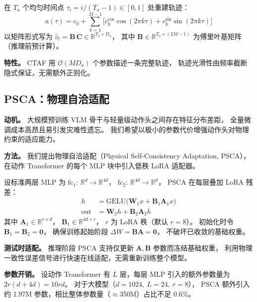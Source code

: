 \documentclass[10pt,twocolumn]{article}
\begin{document}
在 $T_a$ 个均匀时间点 $\tau_i = i/(T_a{-}1) \in [0,1]$ 处重建轨迹：
\begin{equation}
  a(\tau) = c_0 + \sum_{k=1}^{M-1}
    \bigl[c_k^{\cos}\cos(2\pi k\tau)
        + c_k^{\sin}\sin(2\pi k\tau)\bigr]
\end{equation}
以矩阵形式写为
$\hat{v}_t = \mathbf{B}\,\mathbf{C} \in \mathbb{R}^{T_a \times D_a}$，
其中 $\mathbf{B} \in \mathbb{R}^{T_a \times (2M-1)}$ 为傅里叶基矩阵（推理前预计算）。

\noindent\textbf{特性。}
CTAF 用 $\mathcal{O}(MD_a)$ 个参数描述一条完整轨迹，
轨迹光滑性由频率截断隐式保证，无需额外正则化。

\subsection{PSCA：物理自洽适配}
\label{sec:psca}

\noindent\textbf{动机。}
大规模预训练 VLM 骨干与轻量级动作头之间存在特征分布差距，
全量微调成本高昂且易引发灾难性遗忘。
我们希望以极小的参数代价增强动作头对物理约束的适应能力。

\noindent\textbf{方法。}
我们提出物理自洽适配（Physical Self-Consistency Adaptation, PSCA），
在动作 Transformer 的每个 MLP 块中引入低秩 LoRA 适配器。

设标准两层 MLP 为
$\mathrm{fc}_1{:}\ \mathbb{R}^{d} \to \mathbb{R}^{4d}$，
$\mathrm{fc}_2{:}\ \mathbb{R}^{4d} \to \mathbb{R}^{d}$，
PSCA 在每层叠加 LoRA 残差：
\begin{align}
  h   &= \mathrm{GELU}\!\bigl(\mathbf{W}_1 x + \mathbf{B}_1\mathbf{A}_1 x\bigr) \\
  \mathrm{out} &= \mathbf{W}_2 h + \mathbf{B}_2\mathbf{A}_2 h
\end{align}
其中 $\mathbf{A}_1 \in \mathbb{R}^{r \times d}$，
$\mathbf{B}_1 \in \mathbb{R}^{4d \times r}$，
$r$ 为 LoRA 秩（默认 $r{=}8$）。
初始化时令 $\mathbf{B}_1 = \mathbf{B}_2 = \mathbf{0}$，
确保训练起始阶段 $\Delta W = \mathbf{B}\mathbf{A} = \mathbf{0}$，
不破坏已收敛的基础权重。

\noindent\textbf{测试时适配。}
推理阶段 PSCA 支持仅更新 $\mathbf{A},\mathbf{B}$ 参数而冻结基础权重，
利用物理一致性误差信号进行快速在线适配，无需重新训练整个模型。

\noindent\textbf{参数开销。}
设动作 Transformer 有 $L$ 层，每层 MLP 引入的额外参数量为
$2r(d + 4d) = 10rd$。
对于大模型（$d{=}1024,\ L{=}24,\ r{=}8$），
PSCA 额外引入约 1.97M 参数，相比整体参数量（$\approx$350M）占比不足 0.6\%。
\end{document}
